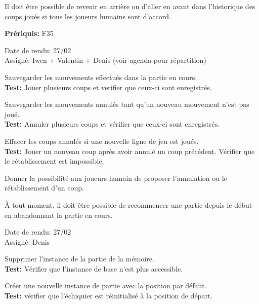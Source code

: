 \documentclass{article}
\begin{document}
\begin{needbox}
    Il doit être possible de revenir en arrière ou d'aller en avant dans l'historique des coups joués si tous les joueurs humains sont d'accord.

    \textbf{Prériquis:} F35
    \begin{duedatebox}
        Date de rendu: 27/02\\
        Assigné: Iwen + Valentin + Denis (voir agenda pour répartition)
    \end{duedatebox}
    \begin{subneedbox}
        Sauvegarder les mouvements effectués dans la partie en cours.\\
        \textbf{Test:} Jouer plusieurs coups et verifier que ceux-ci sont enregistrés.
    \end{subneedbox}
    \begin{subneedbox}
        Sauvegarder les mouvements annulés tant qu'un nouveau mouvement n'est pas joué.\\
        \textbf{Test:} Annuler plusieurs coups et vérifier que ceux-ci sont enregistrés.
    \end{subneedbox}
    \begin{subneedbox}
        Effacer les coups annulés si une nouvelle ligne de jeu est joués.\\
        \textbf{Test:} Jouer un nouveau coup après avoir annulé un coup précédent. Vérifier que le rétablissement est impossible.
    \end{subneedbox}
    \begin{subneedbox}
        Donner la possibilité aux joueurs humain de proposer l'annulation ou le rétablissement d'un coup.
    \end{subneedbox}
\end{needbox}

\begin{needbox}
    À tout moment, il doit être possible de recommencer une partie depuis le début en abandonnant la partie en cours.
    \begin{duedatebox}
        Date de rendu: 27/02\\
        Assigné: Denis
    \end{duedatebox}
    \begin{subneedbox}
        Supprimer l'instance de la partie de la mémoire.\\
        \textbf{Test:} Vérifier que l'instance de base n'est plus accessible.
    \end{subneedbox}
    \begin{subneedbox}
        Créer une nouvelle instance de partie avec la position par défaut.\\
        \textbf{Test:} vérifier que l'échiquier est réinitialisé à la position de départ.
    \end{subneedbox}
\end{needbox}
\end{document}
